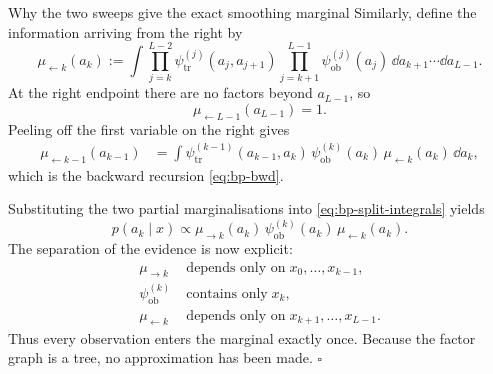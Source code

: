 \begin{toolbox}{Why the two sweeps give the exact smoothing marginal}
Similarly, define the information arriving from the right by
\begin{equation}
  \mu_{\leftarrow k}(a_k)
  :=
  \int
  \prod_{j=k}^{L-2}
    \psi_{\mathrm{tr}}^{(j)}(a_j,a_{j+1})
  \prod_{j=k+1}^{L-1}
    \psi_{\mathrm{ob}}^{(j)}(a_j)
  \,\dd a_{k+1}\cdots\dd a_{L-1}.
  \label{eq:bp-bwd-partial}
\end{equation}
At the right endpoint there are no factors beyond $a_{L-1}$, so
\begin{equation}
  \mu_{\leftarrow L-1}(a_{L-1})=1.
\end{equation}
Peeling off the first variable on the right gives
\begin{align}
  \mu_{\leftarrow k-1}(a_{k-1})
  &=
  \int
  \psi_{\mathrm{tr}}^{(k-1)}(a_{k-1},a_k)\,
  \psi_{\mathrm{ob}}^{(k)}(a_k)\,
  \mu_{\leftarrow k}(a_k)\,
  \dd a_k,
\end{align}
which is the backward recursion \eqref{eq:bp-bwd}.

Substituting the two partial marginalisations into
\eqref{eq:bp-split-integrals} yields
\begin{equation}
  \boxed{
  p(a_k\mid x)
  \propto
  \mu_{\to k}(a_k)\,
  \psi_{\mathrm{ob}}^{(k)}(a_k)\,
  \mu_{\leftarrow k}(a_k)
  }.
  \label{eq:bp-combine-proof}
\end{equation}
The separation of the evidence is now explicit:
\begin{align}
  \mu_{\to k}
  &\;\text{depends only on}\;
  x_0,\ldots,x_{k-1},\\
  \psi_{\mathrm{ob}}^{(k)}
  &\;\text{contains only}\;
  x_k,\\
  \mu_{\leftarrow k}
  &\;\text{depends only on}\;
  x_{k+1},\ldots,x_{L-1}.
\end{align}
Thus every observation enters the marginal exactly once. Because the factor
graph is a tree, no approximation has been made.
\hfill$\square$
\end{toolbox}


